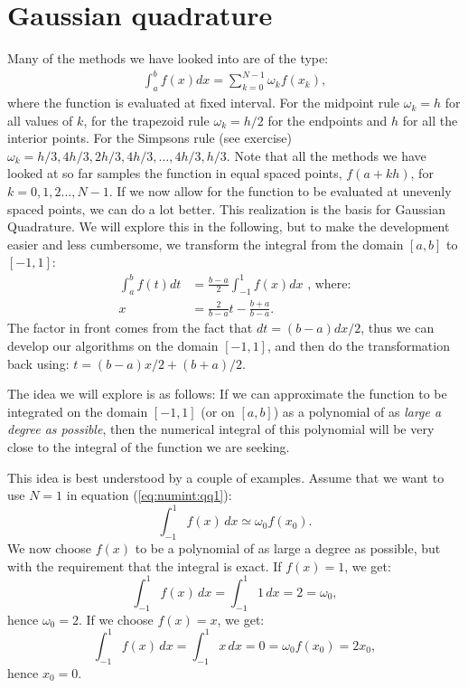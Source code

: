 \documentclass[graybox,sectrefs,envcountresetchap,open=right,final]{svmonodo}
\newenvironment{graybox2admon}[1][]{
\begin{graybox2mdframed}[frametitle=#1]
}
{
\end{graybox2mdframed}
}
\begin{document}
\section{Gaussian quadrature}
Many of the methods we have looked into are of the type:
\begin{align}
	\int_a^b f(x) dx = \sum_{k=0}^{N-1} \omega_k f(x_k),\label{eq:numint:qq1}
\end{align}
where the function is evaluated at fixed interval. For the midpoint rule $\omega_k=h$ for all values of $k$, for the trapezoid rule 
$\omega_k=h/2$ for the endpoints and $h$ for all the interior points. 
For the Simpsons rule (see exercise) $\omega_k=h/3, 4h/3,2h/3,4h/3,\ldots,4h/3,h/3$. 
Note that all the methods we have looked at so far samples the function in equal spaced points, $f(a+k h)$, 
for $k=0, 1, 2\ldots, N-1$. If we now allow for the function to be evaluated at unevenly spaced points, we can do a lot better. 
This realization is the basis for Gaussian Quadrature. We will explore this in the following, 
but to make the development easier and less cumbersome, we transform the integral from the domain $[a,b]$ to $[-1,1]$:
\begin{align}
\int_a^bf(t)dt&=\frac{b-a}{2}\int_{-1}^{1}f(x)dx\text{ , where:}\\ 
x&=\frac{2}{b-a}t-\frac{b+a}{b-a}.
\end{align}
The factor in front comes from the fact that $dt=(b-a)dx/2$, thus we can develop our algorithms on the domain $[-1,1]$, 
and then do the transformation back using: $t=(b-a)x/2+(b+a)/2$.



\begin{graybox2admon}[Notice]
The idea we will explore is as follows:
If we can approximate the function to be integrated on the domain $[-1,1]$ (or on $[a,b]$) as a 
polynomial of as \emph{large a degree as possible}, then the numerical integral of this polynomial will be very close to the integral of the 
function we are seeking.
\end{graybox2admon}



This idea is best understood by a couple of examples. Assume that we want to use $N=1$ in equation (\ref{eq:numint:qq1}):
\begin{equation}
\int_{-1}^{1}f(x)\,dx\simeq\omega_0f(x_0).
\end{equation}
We now choose $f(x)$ to be a polynomial of as large a degree as possible, but with the requirement that the integral is exact. If $f(x)=1$, we get:
\begin{equation}
\int_{-1}^{1}f(x)\,dx=\int_{-1}^{1}1\,dx=2=\omega_0,
\end{equation}
hence $\omega_0=2$. If we choose $f(x)=x$, we get:
\begin{equation}
\int_{-1}^{1}f(x)\,dx=\int_{-1}^{1}x\,dx=0=\omega_0f(x_0)=2x_0,
\end{equation}
hence $x_0=0$. 
\end{document}

